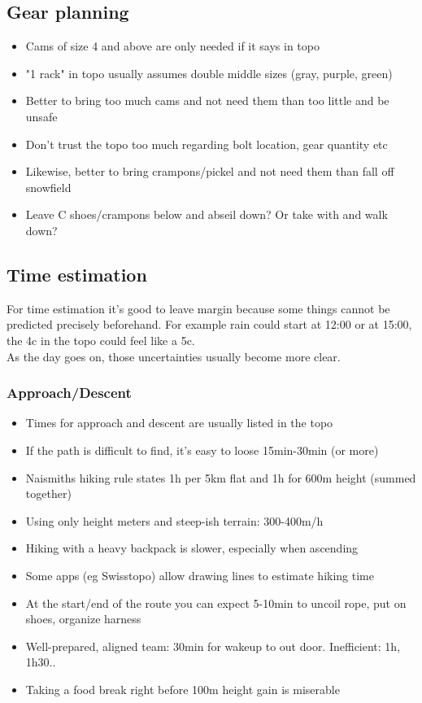 \subsection{Gear planning}
\begin{itemize}
\item Cams of size 4 and above are only needed if it says in topo
\item "1 rack" in topo usually assumes double middle sizes (gray, purple, green)
\item Better to bring too much cams and not need them than too little and be unsafe
\item Don't trust the topo too much regarding bolt location, gear quantity etc
\item Likewise, better to bring crampons/pickel and not need them than fall off snowfield
\item Leave C shoes/crampons below and abseil down? Or take with and walk down?
\end{itemize}

\subsection{Time estimation}
For time estimation it's good to leave margin because some things cannot be predicted precisely beforehand. For example rain could start at 12:00 or at 15:00, the 4c in the topo could feel like a 5c.\\
As the day goes on, those uncertainties usually become more clear.
\subsubsection{Approach/Descent}
\begin{itemize}
\item Times for approach and descent are usually listed in the topo
\item If the path is difficult to find, it's easy to loose 15min-30min (or more)
\item Naismiths hiking rule states 1h per 5km flat and 1h for 600m height (summed together)
\item Using only height meters and steep-ish terrain: 300-400m/h
\item Hiking with a heavy backpack is slower, especially when ascending
\item Some apps (eg Swisstopo) allow drawing lines to estimate hiking time
\item At the start/end of the route you can expect 5-10min to uncoil rope, put on shoes, organize harness
\item Well-prepared, aligned team: 30min for wakeup to out door. Inefficient: 1h, 1h30..
\item Taking a food break right before 100m height gain is miserable
\end{itemize}

